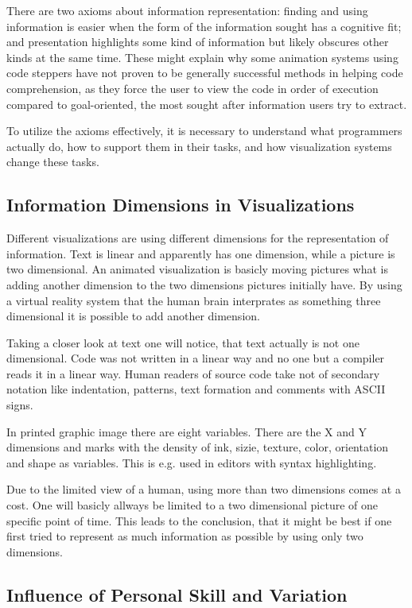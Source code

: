 \documentclass[11pt, a4paper, ngerman, twoside]{article}
\theoremstyle{plain}\newtheorem{Lemma}{Lemma}
\theoremstyle{plain}\newtheorem{Satz}[Lemma]{Satz}
\theoremstyle{definition}\newtheorem{Definition}[Lemma]{Definition}
\theoremstyle{definition}\newtheorem*{Beispiel}{Beispiel}
\theoremstyle{remark}\newtheorem*{Bemerkung}{Bemerkung}
\begin{document}
There are two axioms about information representation: finding and using information is easier when the form of the information sought has a cognitive fit; and presentation highlights some kind of information but likely obscures other kinds at the same time. These might explain why some animation systems using code steppers have not proven to be generally successful methods in helping code comprehension, as they force the user to view the code in order of execution compared to goal-oriented, the most sought after information users try to extract.

To utilize the axioms effectively, it is necessary to understand what programmers actually do, how to support them in their tasks, and how visualization systems change these tasks.

\subsection{Information Dimensions in Visualizations}

Different visualizations are using different dimensions for the representation of information. Text is linear and apparently has one dimension, while a picture is two dimensional. An animated visualization is basicly moving pictures what is adding another dimension to the two dimensions pictures initially have. By using a virtual reality system that the human brain interprates as something three dimensional it is possible to add another dimension.

Taking a closer look at text one will notice, that text actually is not one dimensional. Code was not written in a linear way and no one but a compiler reads it in a linear way. Human readers of source code take not of secondary notation \cite{green} like indentation, patterns, text formation and comments with ASCII signs.

In printed graphic image there are eight variables\cite{bertin}. There are the X and Y dimensions and marks with the density of ink, sizie, texture, color, orientation and shape as variables. This is e.g. used in editors with syntax highlighting.

Due to the limited view of a human, using more than two dimensions comes at a cost. One will basicly allways be limited to a two dimensional picture of one specific point of time. This leads to the conclusion, that it might be best if one first tried to represent as much information as possible by using only two dimensions.

\subsection{Influence of Personal Skill and Variation}
\end{document}
